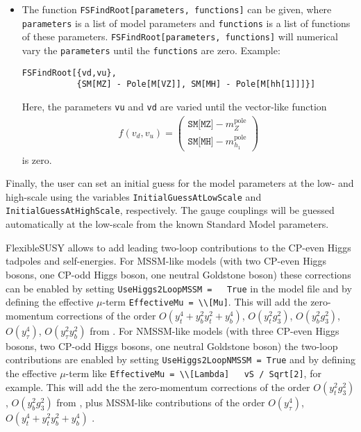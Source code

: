 \documentclass[final,3p,11pt,pdflatex]{elsarticle}
\makeatletter
\newcommand{\fs}{FlexibleSUSY\@\xspace}
\newcommand{\code}[1]{\lstinline|#1|}  %
\newcommand{\pole}{\text{pole}}
\makeatother
\begin{document}
\begin{itemize}
\item The function \code{FSFindRoot[parameters, functions]} can be
  given, where \code{parameters} is a list of model parameters and
  \code{functions} is a list of functions of these parameters.
  \code{FSFindRoot[parameters, functions]} will numerical vary the
  \code{parameters} until the \code{functions} are zero.  Example:
  \begin{lstlisting}
FSFindRoot[{vd,vu},
           {SM[MZ] - Pole[M[VZ]], SM[MH] - Pole[M[hh[1]]]}]
  \end{lstlisting}
  Here, the parameters \code{vu} and \code{vd} are varied until the
  vector-like function
  \begin{align}
    f(v_d,v_u) =
    \begin{pmatrix}
      \texttt{SM[MZ]} - m_Z^\pole \\
      \texttt{SM[MH]} - m_{h_1}^\pole
    \end{pmatrix}
  \end{align}
  is zero.
\end{itemize}
%
Finally, the user can set an initial guess for the model parameters at
the low- and high-scale using the variables
\code{InitialGuessAtLowScale} and \code{InitialGuessAtHighScale},
respectively.  The gauge couplings will be guessed automatically at
the low-scale from the known Standard Model parameters.

\fs allows to add leading two-loop contributions to the CP-even Higgs
tadpoles and self-energies.  For MSSM-like models (with two CP-even
Higgs bosons, one CP-odd Higgs boson, one neutral Goldstone boson)
these corrections can be enabled by setting \code{UseHiggs2LoopMSSM =
  True} in the model file and by defining the effective $\mu$-term
\code{EffectiveMu = \\[Mu]}.  This will add the zero-momentum
corrections of the order $O(y_t^4 + y_b^2 y_t^2 + y_b^4)$, $O(y_t^2
g_3^2)$, $O(y_b^2 g_3^2)$, $O(y_\tau^4)$, $O(y_\tau^2 y_b^2)$ from
\cite{Degrassi:2001yf,Brignole:2001jy,Dedes:2002dy,Brignole:2002bz,Dedes:2003km}.
For NMSSM-like models (with three CP-even Higgs bosons, two CP-odd
Higgs bosons, one neutral Goldstone boson) the two-loop contributions
are enabled by setting \code{UseHiggs2LoopNMSSM = True} and by
defining the effective $\mu$-term like \code{EffectiveMu = \\[Lambda]
  vS / Sqrt[2]}, for example.  This will add the the zero-momentum
corrections of the order $O(y_t^2 g_3^2)$, $O(y_b^2 g_3^2)$ from
\cite{Degrassi:2009yq}, plus MSSM-like contributions of the order
$O(y_\tau^4)$, $O(y_t^4 + y_t^2 y_b^2 + y_b^4)$
\cite{Brignole:2001jy,Dedes:2003km}.
\end{document}
